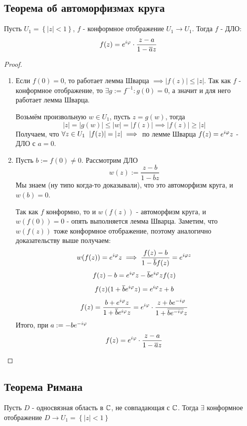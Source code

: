 \subsection{Теорема об автоморфизмах круга}
\begin{implication}
  Пусть $U_1 = \left\{|z|<1\right\}$, $f$ - конформное отображение $U_1\to U_1$. Тогда $f$ - ДЛО:
  \[f(z) = e^{i\varphi}\cdot \frac{z-a}{1-\overline{a}z}\]
\end{implication}
\begin{proof}
 \begin{enumerate}
   \item Если $f(0) = 0$, то работает лемма Шварца $\implies |f(z)|\leqslant |z|$. Так как $f$ - конформное отображение, то $\exists g:=f^{-1}\colon g(0) = 0$, а значит и для него работает лемма Шварца.

   Возьмём произвольную $w\in U_1$, пусть $z=g(w)$, тогда
   \[|z| = |g(w)|\leqslant |w| = |f(z)|\implies |f(z)|\geqslant |z|\]
   Получаем, что $\forall z\in U_1\hspace{0.2cm} |f(z)|=|z|\implies$ по лемме Шварца $f(z) = e^{i\varphi}z$ - ДЛО с $a=0$. 
   \item Пусть $b:=f(0)\neq 0$. Рассмотрим ДЛО
   \[w(z):= \frac{z-b}{1-\overline{b}z}\]
   Мы знаем (ну типо когда-то доказывали), что это автоморфизм круга, и $w(b) = 0$.

   Так как $f$ конформно, то и $w(f(z))$ - автоморфизм круга, и $w(f(0)) = 0$ - опять выполняется лемма Шварца. Заметим, что $w(f(z))$ тоже конформное отображение, поэтому аналогично доказательству выше получаем:
   \[w(f(z)) = e^{i\varphi}z\implies \frac{f(z)-b}{1-\overline{b}f(z)}=e^{i\varphi z}\]
   \[f(z)-b = e^{i\varphi}z - \overline{b}e^{i\varphi}zf(z)\]
   \[f(z)(1+\overline{b}e^{i\varphi}z) = e^{i\varphi}z + b\]
   \[f(z) = \frac{b+e^{i\varphi}z}{1+\overline{b}e^{i\varphi}z} = e^{i\varphi}\cdot\frac{z+be^{-i\varphi}}{1+\overline{be^{-i\varphi}}z}\]
   Итого, при $a:= -be^{-i\varphi}$
   \[f(z) = e^{i\varphi}\cdot \frac{z-a}{1-\overline{a}z}\]
 \end{enumerate} 
\end{proof}
\subsection{Теорема Римана}
\begin{theorem}
  Пусть $D$ - односвязная область в $\mathbb{C}$, не совпадающая с $\mathbb{C}$. Тогда $\exists$ конформное отображение $D\to U_1 = \left\{|z|<1\right\}$ 
\end{theorem}
